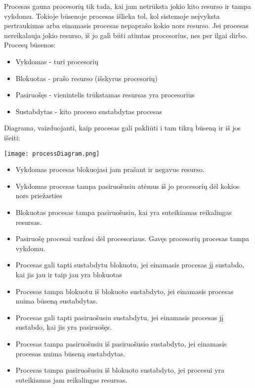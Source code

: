 Procesas gauna procesorių tik tada, kai jam netrūksta jokio kito resurso ir tampa vykdomu. Tokioje būsenoje procesas išlieka tol, kol sistemoje neįvyksta pertraukimas 
arba einamasis procesas nepaprašo kokio nors resurso. Jei procesas nereikalauja jokio resurso, iš jo gali būti atimtas procesorius, nes per ilgai dirbo.\\
Procesų būsenos:
	\begin{itemize}
		\item Vykdomas - turi procesorių
		\item Blokuotas - prašo resurso (išskyrus procesorių)
		\item Pasiruošęs - vienintelis trūkstamas resursas yra procesorius
		\item Sustabdytas - kito proceso sustabdytas procesas
	\end{itemize}

Diagrama, vaizduojanti, kaip procesas gali pakliūti i tam tikrą būseną ir iš jos išeiti:

\texttt{[image: processDiagram.png]}

	\begin{itemize}
		\item Vykdomas procesas blokuojasi jam prašant ir negavus resurso.
		\item Vykdomas procesas tampa pasiruošusiu atėmus iš jo procesorių dėl kokios nors priežasties
		\item Blokuotas procesas tampa pasiruošusiu, kai yra suteikiamas reikalingas resursas.
		\item Pasiruošę procesai varžosi dėl procesoriaus. Gavęs procesorių procesas tampa vykdomu.
		\item Procesas gali tapti sustabdytu blokuotu, jei einamasis procesas jį sustabdo, kai jis jau ir taip jau yra blokuotas
		\item Procesas tampa blokuotu iš blokuoto sustabdyto, jei einamasis procesas nuima būseną sustabdytas.
		\item Procesas gali tapti pasiruošusiu sustabdytu, jei einamasis procesas jį sustabdo, kai jis yra pasiruošęs.
		\item Procesas tampa pasiruošusiu iš pasiruošusio sustabdyto, jei einamasis procesas nuima būseną sustabdytas.
		\item Procesas tampa pasiruošusiu iš blokuoto sustabdyto, jei procesui yra suteikiamas jam reikalingas resursas.
	\end{itemize}


